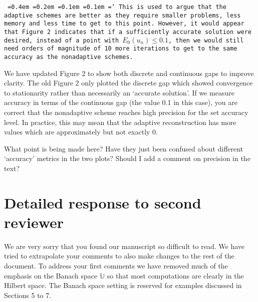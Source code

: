 \documentclass[12pt]{article}
\newcommand*\justify{%
	\fontdimen2\font=0.4em%
	\fontdimen3\font=0.2em%
	\fontdimen4\font=0.1em%
	\fontdimen7\font=0.1em%
	\hyphenchar\font=`\-%
}
\newcommand{\review}[1]{\texttt{\justify{#1}}}
\newcommand{\F}[1]{\mathbb{#1}}
\newcommand{\todo}[1]{{\color{red} #1}}
\begin{document}
\begin{enumerate}
	\review{This is used to argue that the adaptive schemes are better as they require smaller problems, less memory and less time to get to this point. However, it would appear that Figure 2 indicates that if a sufficiently accurate solution were desired, instead of a point with $E_0(u_n)\leq 0.1$, then we would still need orders of magnitude of 10 more iterations to get to the same accuracy as the nonadaptive schemes.}
	
	We have updated Figure 2 to show both discrete and continuous gaps to improve clarity. The old Figure 2 only plotted the discrete gap which showed convergence to stationarity rather than necessarily an `accurate solution'. If we measure accuracy in terms of the continuous gap (the value 0.1 in this case), you are correct that the nonadaptive scheme reaches high precision for the set accuracy level. In practice, this may mean that the adaptive reconstruction has more values which are approximately but not exactly 0.
	
	\todo{What point is being made here? Have they just been confused about different `accuracy' metrics in the two plots? Should I add a comment on precision in the text?}
\end{enumerate}

\section{Detailed response to second reviewer}
We are very sorry that you found our manuscript so difficult to read. We have tried to extrapolate your comments to also make changes to the rest of the document. To address your first comments we have removed much of the emphasis on the Banach space $\F U$ so that most computations are clearly in the Hilbert space. The Banach space setting is reserved for examples discussed in Sections 5 to 7.
\end{document}
